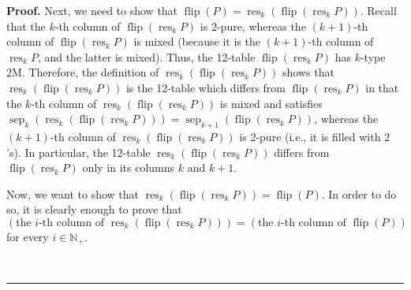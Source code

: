 \documentclass[numbers=enddot,12pt,final,onecolumn,notitlepage]{scrartcl}%
\theoremstyle{definition}
\newenvironment{proof}[1][Proof]{\noindent\textbf{#1.} }{\ \rule{0.5em}{0.5em}}
\begin{document}
\begin{proof}
Next, we need to show that $\operatorname*{flip}\left(  P\right)
=\operatorname*{res}\nolimits_{k}\left(  \operatorname*{flip}\left(
\operatorname*{res}\nolimits_{k}P\right)  \right)  $. Recall that the $k$-th
column of $\operatorname*{flip}\left(  \operatorname*{res}\nolimits_{k}%
P\right)  $ is 2-pure, whereas the $\left(  k+1\right)  $-th column of
$\operatorname*{flip}\left(  \operatorname*{res}\nolimits_{k}P\right)  $ is
mixed (because it is the $\left(  k+1\right)  $-th column of
$\operatorname*{res}\nolimits_{k}P$, and the latter is mixed). Thus, the
12-table $\operatorname*{flip}\left(  \operatorname*{res}\nolimits_{k}%
P\right)  $ has $k$-type 2M. Therefore, the definition of $\operatorname*{res}%
\nolimits_{k}\left(  \operatorname*{flip}\left(  \operatorname*{res}%
\nolimits_{k}P\right)  \right)  $ shows that $\operatorname*{res}%
\nolimits_{k}\left(  \operatorname*{flip}\left(  \operatorname*{res}%
\nolimits_{k}P\right)  \right)  $ is the 12-table which differs from
$\operatorname*{flip}\left(  \operatorname*{res}\nolimits_{k}P\right)  $ in
that the $k$-th column of $\operatorname*{res}\nolimits_{k}\left(
\operatorname*{flip}\left(  \operatorname*{res}\nolimits_{k}P\right)  \right)
$ is mixed and satisfies $\operatorname*{sep}\nolimits_{k}\left(
\operatorname*{res}\nolimits_{k}\left(  \operatorname*{flip}\left(
\operatorname*{res}\nolimits_{k}P\right)  \right)  \right)
=\operatorname*{sep}\nolimits_{k+1}\left(  \operatorname*{flip}\left(
\operatorname*{res}\nolimits_{k}P\right)  \right)  $, whereas the $\left(
k+1\right)  $-th column of $\operatorname*{res}\nolimits_{k}\left(
\operatorname*{flip}\left(  \operatorname*{res}\nolimits_{k}P\right)  \right)
$ is 2-pure (i.e., it is filled with $2$'s). In particular, the 12-table
$\operatorname*{res}\nolimits_{k}\left(  \operatorname*{flip}\left(
\operatorname*{res}\nolimits_{k}P\right)  \right)  $ differs from
$\operatorname*{flip}\left(  \operatorname*{res}\nolimits_{k}P\right)  $ only
in its columns $k$ and $k+1$.

Now, we want to show that $\operatorname*{res}\nolimits_{k}\left(
\operatorname*{flip}\left(  \operatorname*{res}\nolimits_{k}P\right)  \right)
=\operatorname*{flip}\left(  P\right)  $. In order to do so, it is clearly
enough to prove that%
\begin{equation}
\left(  \text{the }i\text{-th column of }\operatorname*{res}\nolimits_{k}%
\left(  \operatorname*{flip}\left(  \operatorname*{res}\nolimits_{k}P\right)
\right)  \right)  =\left(  \text{the }i\text{-th column of }%
\operatorname*{flip}\left(  P\right)  \right)
\label{pf.lem.BK.res.flip.pf.c2.icol}%
\end{equation}
for every $i\in\mathbb{N}_{+}$.


\end{proof}
\end{document}
